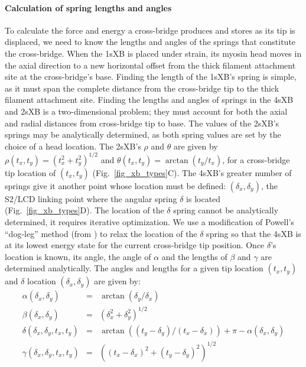 \documentclass[]{article}
\begin{document}
\paragraph{Calculation of spring lengths and angles} %
To calculate the force and energy a cross-bridge produces and stores as its tip is displaced, we need to know the lengths and angles of the springs that constitute the cross-bridge. 
When the 1sXB is placed under strain, its myosin head moves in the axial direction to a new horizontal offset from the thick filament attachment site at the cross-bridge's base.
Finding the length of the 1sXB's spring is simple, as it must span the complete distance from the cross-bridge tip to the thick filament attachment site. 
Finding the lengths and angles of springs in the 4sXB and 2sXB is a two-dimensional problem; they must account for both the axial and radial distances from cross-bridge tip to base.
The values of the 2sXB's springs may be analytically determined, as both spring values are set by the choice of a head location. 
The 2sXB's  $\rho$ and $\theta$ are given by $\rho(t_x, t_y)=(t_x^2 + t_y^2)^{1/2}$ and $\theta(t_x, t_y)=\arctan(t_y/t_x)$, for a cross-bridge tip location of $(t_x, t_y)$ (Fig.~\ref{fig_xb_types}C). 
The 4sXB's greater number of springs give it another point whose location must be defined: $(\delta_x, \delta_y)$, the S2/LCD linking point where the angular spring $\delta$ is located (Fig.~\ref{fig_xb_types}D). 
The location of the $\delta$ spring cannot be analytically determined, it requires iterative optimization. 
We use a modification of Powell's ``dog-leg'' method (from \citet{SciPy}) to relax the location of the $\delta$ spring so that the 4sXB is at its lowest energy state for the current cross-bridge tip position.
Once $\delta$'s location is known, its angle, the angle of $\alpha$ and the lengths of $\beta$ and $\gamma$ are determined analytically.
The angles and lengths for a given tip location $(t_x, t_y)$ and $\delta$ location $(\delta_x, \delta_y)$ are given by:
\begin{eqnarray*}
\label{4sXB_spring_values}
\alpha(\delta_x, \delta_y) &=& \arctan(\delta_y/\delta_x) \\
\beta(\delta_x, \delta_y) &=& (\delta_x^2 + \delta_y^2)^{1/2} \\
\delta(\delta_x, \delta_y, t_x, t_y) &=& \arctan((t_y-\delta_y)/(t_x-\delta_x)) + \pi - \alpha(\delta_x, \delta_y) \\
\gamma(\delta_x, \delta_y, t_x, t_y) &=& ((t_x-\delta_x)^2 + (t_y-\delta_y)^2)^{1/2} 
\end{eqnarray*}
\end{document}
